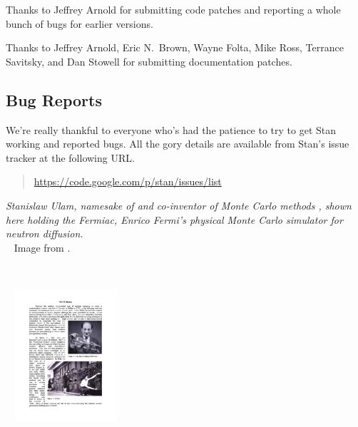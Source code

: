 Thanks to Jeffrey Arnold for submitting code patches and reporting
a whole bunch of bugs for earlier versions. 

Thanks to Jeffrey Arnold, Eric N.~Brown, Wayne Folta, Mike Ross,
Terrance Savitsky, and Dan Stowell for submitting documentation
patches.

\subsection*{Bug Reports}

We're really thankful to everyone who's had the patience to try
to get Stan working and reported bugs.  All the gory details are
available from Stan's issue tracker at the following URL.
%
\begin{quote}
\url{https://code.google.com/p/stan/issues/list}
\end{quote}




\vfill
\begin{center}
\hfill
\begin{minipage}[b]{2in}
  \footnotesize {\it Stanislaw Ulam, namesake of \Stan and co-inventor
    of Monte Carlo methods \citep{MetropolisUlam:1949}, shown here
    holding the Fermiac, Enrico Fermi's physical Monte Carlo simulator
    for neutron diffusion.}
  \\[3pt] \mbox{ } \hfill
  {\scriptsize Image from \citep{Giesler:2000}.}
\end{minipage} \ \ \ \ \ 
\begin{minipage}[b]{1.5in} \mbox{ } \hfill
  \includegraphics[width=1.5in]{../../../logos/ulam-fermiac.pdf}
\end{minipage} 
\end{center}
